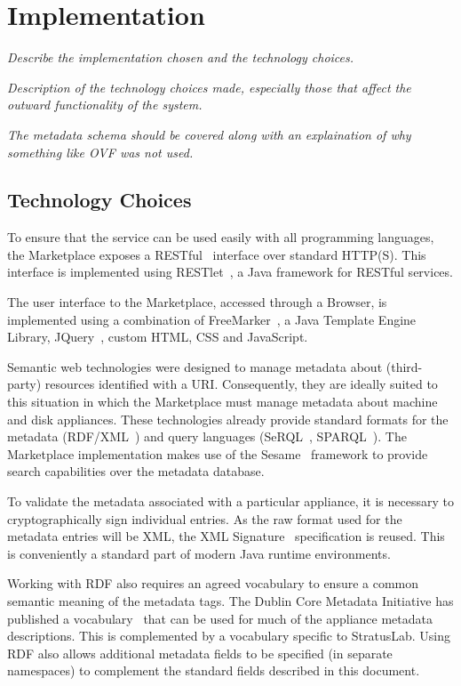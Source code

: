 \section{Implementation}
\label{sec:implementation}

{\em Describe the implementation chosen and the technology choices.}

{\em Description of the technology choices made, especially those that
  affect the outward functionality of the system.}

{\em The metadata schema should be covered along with an explaination
  of why something like OVF was not used.}

\subsection{Technology Choices}

To ensure that the service can be used easily with all programming
languages, the Marketplace exposes a RESTful~\cite{rest} interface
over standard HTTP(S).  This interface is implemented using
RESTlet~\cite{restlet}, a Java framework for RESTful
services.

The user interface to the Marketplace, accessed through a Browser, is implemented
using a combination of FreeMarker~\cite{freemarker}, a Java Template Engine Library, 
JQuery~\cite{jquery}, custom HTML, CSS and JavaScript.

Semantic web technologies were designed to manage metadata about
(third-party) resources identified with a URI.  Consequently, they are
ideally suited to this situation in which the Marketplace must manage
metadata about machine and disk appliances.  These technologies already
provide standard formats for the metadata (RDF/XML~\cite{rdfxml,
  rdfprimer, rdfschema}) and query languages (SeRQL~\cite{serql},
SPARQL~\cite{sparql}).  The Marketplace implementation makes use of the
Sesame~\cite{sesame} framework to provide search
capabilities over the metadata database.

To validate the metadata associated with a particular appliance, it is
necessary to cryptographically sign individual entries.  As the raw
format used for the metadata entries will be XML, the XML
Signature~\cite{xmlsig} specification is reused.  This is
conveniently a standard part of modern Java runtime environments.

Working with RDF also requires an agreed vocabulary to ensure a common
semantic meaning of the metadata tags.  The Dublin Core Metadata
Initiative has published a vocabulary~\cite{dcterms} that can be used
for much of the appliance metadata descriptions.  This is complemented by
a vocabulary specific to StratusLab.  Using RDF also allows additional
metadata fields to be specified (in separate namespaces) to complement
the standard fields described in this document.

